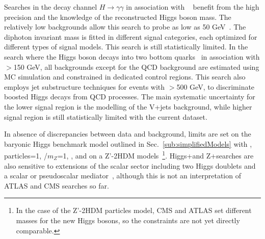 Searches in the decay channel $H \rightarrow \gamma\gamma$ in association with \MET~\cite{CMS-PAS-EXO-16-054,Aaboud:2017uak} benefit from the high precision and the knowledge of the reconstructed Higgs boson mass. The relatively low backgrounds allow this search to probe \MET as low as 50 GeV~\cite{CMS-PAS-EXO-16-054}. The diphoton invariant mass is fitted in different signal categories, each optimized for different types of signal models. This search is still statistically limited. 
In the search where the Higgs boson decays into two bottom quarks~\cite{Aaboud:2017yqz}
in association with \MET$>$150 GeV, all backgrounds except for the QCD background are estimated using MC simulation and constrained in dedicated control regions. 
This search also employs jet substructure techniques for events with \MET$>$500 GeV, to discriminate boosted Higgs decays from QCD processes. The main systematic uncertainty for the lower \MET signal region is the modelling of the V+jets background, while higher \MET signal region is still statistically limited with the current dataset.

In absence of discrepancies between data and background,
limits are set on the baryonic Higgs benchmark model outlined in
Sec.~\ref{sub:simplifiedModels} with 
, \ginvisible particles=1, \ghZprimeZprime/$m_{Z}$=1, , 
and on a Z'-2HDM models~\footnote{ 
In the case of the Z'-2HDM particles model, CMS and ATLAS set different masses for the 
new Higgs bosons, 
so the constraints are not yet directly comparable.}. Higgs+\MET and Z+\MET searches are also sensitive to extensions of the scalar sector including two Higgs doublets and a scalar or pseudoscalar mediator~\cite{Bauer:2017ota,Ipek:2014gua,No:2015xqa,Goncalves:2016iyg,Bell:2016ekl}, although this is not an interpretation of ATLAS and CMS searches so far. 

